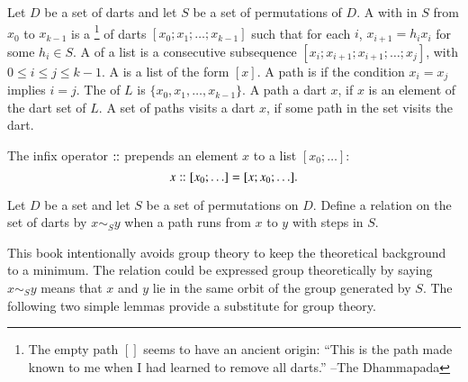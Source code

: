 \begin{definition} 
   Let $D$ be a set of darts and let $S$ be
  a set of permutations of $D$.  A  with 
  in $S$ from $x_0$ to $x_{k-1}$ is a \footnote{The
    empty path $[]$ seems to have an ancient origin: ``This is the
    path made known to me when I had learned to remove all darts.''
    --The Dhammapada} of darts $[x_0;x_1;\ldots;x_{k-1}]$ such that
  for each $i$, $x_{i+1} = h_i x_i$ for some $h_i \in S$.  A
   of a list is a consecutive subsequence
  $[x_i;x_{i+1};x_{i+1};\ldots;x_j]$, with $0\le i\le j\le k-1$.  A
   is a list of the form $[x]$.  A path is
   if the condition $x_i=x_j$ implies $i=j$.  The
   of $L$ is $\{x_0,x_1,\ldots,x_{k-1}\}$.  A path
   a dart $x$, if $x$ is an element of the dart set of
  $L$.  A set of paths visits a dart $x$, if some path in the set
  visits the dart.
\end{definition}

\begin{notation}[$\cooln$]
The infix operator $\cooln$ prepends an element $x$ to a list $[x_0;\ldots]$:
\[ 
x:\hskip-0.02em:[x_0;\ldots] = [x;x_0;\ldots].
\] 
\end{notation}
%
%


\begin{definition}[$\sim_S$]
Let $D$ be a set and let $S$ be a 
set of permutations on $D$.
Define a relation on the set of darts by $x\sim_S y$ when  a
path runs from $x$ to $y$ with steps in $S$.
\end{definition}

This book intentionally avoids group theory to keep the theoretical
background to a minimum.  The relation could be expressed group
theoretically by saying $x\sim_S y$ means that $x$ and $y$ lie in the
same orbit of the group generated by $S$.  The following two simple
lemmas provide a substitute for group theory.

